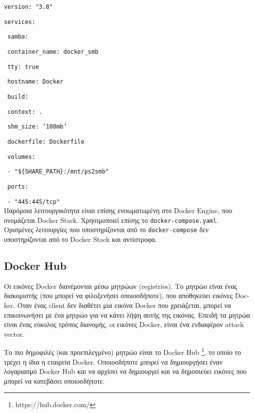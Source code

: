 \texttt{\textlatin{version: "3.8"}}

\texttt{\textlatin{services:}}

\texttt{\textlatin{ \hspace{0.1em} samba:}}

\texttt{\textlatin{ \hspace{0.9em} container\_name: docker\_smb}}

\texttt{\textlatin{ \hspace{0.9em} tty: true}}

\texttt{\textlatin{ \hspace{0.9em} hostname: Docker}}

\texttt{\textlatin{ \hspace{0.9em} build:}}

\texttt{\textlatin{ \hspace{1.7em} context: .}}

\texttt{\textlatin{ \hspace{1.7em} shm\_size: '100mb'}}

\texttt{\textlatin{ \hspace{1.7em} dockerfile: Dockerfile}}

\texttt{\textlatin{ \hspace{0.9em} volumes:}}

\texttt{\textlatin{ \hspace{1.7em} - "\$\{SHARE\_PATH\}:/mnt/ps2smb"}}

\texttt{\textlatin{ \hspace{0.9em} ports:}}

\texttt{\textlatin{ \hspace{1.7em} - "445:445/tcp"}} \\




Παρόμοια λειτουργικότητα είναι επίσης ενσωματωμένη στο
\textlatin{Docker Engine}, που ονομάζεται \textlatin{Docker Stack}.
Χρησιμοποιεί επίσης το \texttt{\textlatin{docker-compose.yaml}}. Ορισμένες
λειτουργίες που υποστηρίζονται από το \texttt{\textlatin{docker-compose}} δεν
υποστηρίζονται από το \textlatin{Docker Stack} και αντίστροφα.


\subsection{\textlatin{Docker Hub}}

Οι εικόνες \textlatin{Docker} διανέμονται μέσω μητρώων (\textlatin{registries}).
Το μητρώο είναι ένας διακομιστής (που μπορεί να φιλοξενήσει οποιοσδήποτε),
που αποθηκεύει εικόνες \textlatin{Docker}. Όταν ένας \textlatin{client} δεν
διαθέτει μια εικόνα \textlatin{Docker} που χρειάζεται, μπορεί να επικοινωνήσει
με ένα μητρώο για να κάνει λήψη αυτής της εικόνας. Επειδή τα μητρώα είναι ένας
εύκολος τρόπος διανομής, oι εικόνες \textlatin{Docker}, είναι ένα ενδιαφέρον
\textlatin{attack vector}.

Το πιο δημοφιλές (και προεπιλεγμένο) μητρώο είναι το \textlatin{Docker Hub}
\footnote{\textlatin{https://hub.docker.com/}}, το οποίο το τρέχει
η ίδια η εταιρεία \textlatin{Docker}. Οποιοσδήποτε μπορεί να
δημιουργήσει έναν λογαριασμό \textlatin{Docker Hub} και να αρχίσει να
δημιουργεί και να δημοσιεύει εικόνες που μπορεί να κατεβάσει οποιοσδήποτε.
